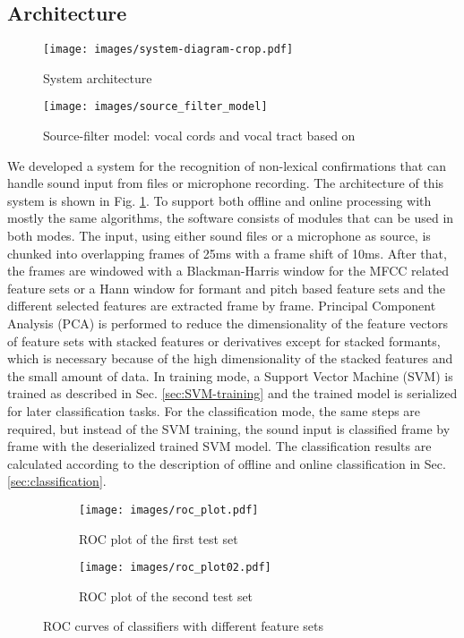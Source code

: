\documentclass[letterpaper]{article}
\begin{document}
\subsection{Architecture}
\begin{figure}[t]
	\centering
	\texttt{[image: images/system-diagram-crop.pdf]}
	\caption{System architecture}
	\label{fig:system-diagram}
\end{figure}
\begin{figure}[t]
	\centering
	\texttt{[image: images/source\_filter\_model]}
	\caption{Source-filter model: vocal cords and vocal tract based on \cite{Philippsen}}
	\label{fig:Source-filter}
\end{figure}
We developed a system for the recognition of non-lexical confirmations that can handle sound input from files or microphone recording. The architecture of this system is shown in Fig. \ref{fig:system-diagram}.
To support both offline and online processing with mostly the same algorithms, the software consists of modules that can be used in both modes. 
The input, using either sound files or a microphone as source, is chunked into overlapping frames of 25ms with a frame shift of 10ms.
After that, the frames are windowed with a Blackman-Harris window \cite{Harris1978} for the MFCC related feature sets or a Hann window \cite{Blackman1959} for formant and pitch based feature sets and the different selected features are extracted frame by frame.
Principal Component Analysis (PCA) \cite{Pearson1901} is performed to reduce the dimensionality of the feature vectors of feature sets with stacked features or derivatives except for stacked formants, which is necessary because of the high dimensionality of the stacked features and the small amount of data.
In training mode, a Support Vector Machine (SVM) \cite{Vapnik1995} is trained as described in Sec. \ref{sec:SVM-training} and the trained model is serialized for later classification tasks. 
For the classification mode, the same steps are required, but instead of the SVM training, the sound input is classified frame by frame with the deserialized trained SVM model.
The classification results are calculated according to the description of offline and online classification in Sec. \ref{sec:classification}.
\begin{figure*}[t]
	\centering
	\begin{subfigure}{.5\textwidth}
	  \centering
	  \texttt{[image: images/roc\_plot.pdf]}
	  \caption{ROC plot of the first test set}
	  \label{fig:sub1}
	\end{subfigure}%
	\begin{subfigure}{.5\textwidth}
	  \centering
	  \texttt{[image: images/roc\_plot02.pdf]}
	  \caption{ROC plot of the second test set}
	  \label{fig:sub2}
	\end{subfigure}
	\caption{ROC curves of classifiers with different feature sets}
	\label{fig:roc_curve}
\end{figure*}
\end{document}
